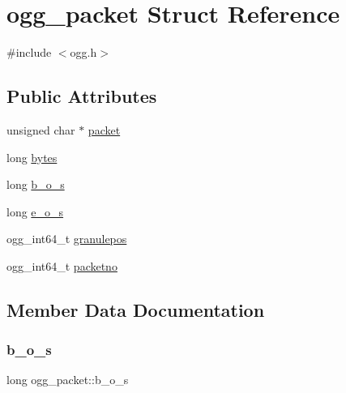 \hypertarget{structogg__packet}{}\section{ogg\+\_\+packet Struct Reference}
\label{structogg__packet}


{\ttfamily \#include $<$ogg.\+h$>$}

\subsection*{Public Attributes}
\begin{DoxyCompactItemize}
\item 
unsigned char $\ast$ \hyperlink{structogg__packet_a57e7096985ec8766dce415e248767c32}{packet}
\item 
long \hyperlink{structogg__packet_a4438269ce6025d8817865ae66d5881f1}{bytes}
\item 
long \hyperlink{structogg__packet_adbf12677237d6f5333017de9b59b4ea7}{b\+\_\+o\+\_\+s}
\item 
long \hyperlink{structogg__packet_aa367e7c5425c5f65cbd126b82dfc72e8}{e\+\_\+o\+\_\+s}
\item 
ogg\+\_\+int64\+\_\+t \hyperlink{structogg__packet_a838d9a000e08bae982409bc2734fc566}{granulepos}
\item 
ogg\+\_\+int64\+\_\+t \hyperlink{structogg__packet_a60e257b3a8f843135474457197c65a45}{packetno}
\end{DoxyCompactItemize}


\subsection{Member Data Documentation}
\mbox{\label{structogg__packet_adbf12677237d6f5333017de9b59b4ea7}} 
\subsubsection{\texorpdfstring{b\+\_\+o\+\_\+s}{b\_o\_s}}
{\footnotesize\ttfamily long ogg\+\_\+packet\+::b\+\_\+o\+\_\+s}

\mbox{\label{structogg__packet_a4438269ce6025d8817865ae66d5881f1}} 

